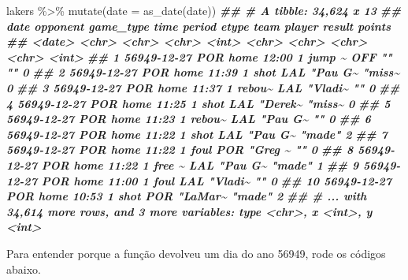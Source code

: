 \documentclass[
]{book}
\newenvironment{Shaded}{\begin{snugshade}}{\end{snugshade}}
\newcommand{\AttributeTok}[1]{\textcolor[rgb]{0.77,0.63,0.00}{#1}}
\newcommand{\DocumentationTok}[1]{\textcolor[rgb]{0.56,0.35,0.01}{\textbf{\textit{#1}}}}
\newcommand{\FunctionTok}[1]{\textcolor[rgb]{0.00,0.00,0.00}{#1}}
\newcommand{\NormalTok}[1]{#1}
\newcommand{\SpecialCharTok}[1]{\textcolor[rgb]{0.00,0.00,0.00}{#1}}
\begin{document}
\begin{Shaded}
\begin{Highlighting}[]
\NormalTok{lakers }\SpecialCharTok{\%\textgreater{}\%}
  \FunctionTok{mutate}\NormalTok{(}\AttributeTok{date =} \FunctionTok{as\_date}\NormalTok{(date))}
\DocumentationTok{\#\# \# A tibble: 34,624 x 13}
\DocumentationTok{\#\#    date       opponent game\_type time  period etype  team  player  result points}
\DocumentationTok{\#\#    \textless{}date\textgreater{}     \textless{}chr\textgreater{}    \textless{}chr\textgreater{}     \textless{}chr\textgreater{}  \textless{}int\textgreater{} \textless{}chr\textgreater{}  \textless{}chr\textgreater{} \textless{}chr\textgreater{}   \textless{}chr\textgreater{}   \textless{}int\textgreater{}}
\DocumentationTok{\#\#  1 56949{-}12{-}27 POR      home      12:00      1 jump \textasciitilde{} OFF   ""      ""          0}
\DocumentationTok{\#\#  2 56949{-}12{-}27 POR      home      11:39      1 shot   LAL   "Pau G\textasciitilde{} "miss\textasciitilde{}      0}
\DocumentationTok{\#\#  3 56949{-}12{-}27 POR      home      11:37      1 rebou\textasciitilde{} LAL   "Vladi\textasciitilde{} ""          0}
\DocumentationTok{\#\#  4 56949{-}12{-}27 POR      home      11:25      1 shot   LAL   "Derek\textasciitilde{} "miss\textasciitilde{}      0}
\DocumentationTok{\#\#  5 56949{-}12{-}27 POR      home      11:23      1 rebou\textasciitilde{} LAL   "Pau G\textasciitilde{} ""          0}
\DocumentationTok{\#\#  6 56949{-}12{-}27 POR      home      11:22      1 shot   LAL   "Pau G\textasciitilde{} "made"      2}
\DocumentationTok{\#\#  7 56949{-}12{-}27 POR      home      11:22      1 foul   POR   "Greg \textasciitilde{} ""          0}
\DocumentationTok{\#\#  8 56949{-}12{-}27 POR      home      11:22      1 free \textasciitilde{} LAL   "Pau G\textasciitilde{} "made"      1}
\DocumentationTok{\#\#  9 56949{-}12{-}27 POR      home      11:00      1 foul   LAL   "Vladi\textasciitilde{} ""          0}
\DocumentationTok{\#\# 10 56949{-}12{-}27 POR      home      10:53      1 shot   POR   "LaMar\textasciitilde{} "made"      2}
\DocumentationTok{\#\# \# ... with 34,614 more rows, and 3 more variables: type \textless{}chr\textgreater{}, x \textless{}int\textgreater{}, y \textless{}int\textgreater{}}
\end{Highlighting}
\end{Shaded}

Para entender porque a função devolveu um dia do ano 56949, rode os códigos abaixo.
\end{document}
